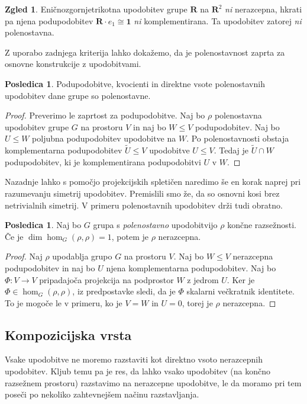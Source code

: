 \documentclass[11pt]{book}
\def\RR{\mathbf{R}}
\def\oneone{\mathbf{1}}
\theoremstyle{definition}
\theoremstyle{zgled}
\newtheorem{zgled}[theorem]{Zgled}
\theoremstyle{zgledbrezstevilke}
\theoremstyle{odprtproblem}
\theoremstyle{domacanaloga}
\newenvironment{dokaz}
    {\color{siva}\begin{proof}}
    {\end{proof}}
\theoremstyle{izrek}
\newtheorem{posledica}[theorem]{Posledica}
\begin{document}
\begin{zgled}
    Eničnozgornjetrikotna upodobitev grupe $\RR$ na $\RR^2$ \emph{ni} nerazcepna, hkrati pa njena podupodobitev $\RR \cdot e_1 \cong \oneone$ \emph{ni} komplementirana. Ta upodobitev zatorej \emph{ni} polenostavna.
\end{zgled}

Z uporabo zadnjega kriterija lahko dokažemo, da je polenostavnost zaprta za osnovne konstrukcije z upodobitvami.

\begin{posledica}
Podupodobitve, kvocienti in direktne vsote polenostavnih upodobitev dane grupe so polenostavne.
\end{posledica}
\begin{dokaz}
Preverimo le zaprtost za podupodobitve. Naj bo $\rho$ polenostavna upodobitev grupe $G$ na prostoru $V$ in naj bo $W \leq V$ podupodobitev. Naj bo $U \leq W$ poljubna podupodobitev upodobitve na $W$. Po polenostavnosti obstaja komplementarna podupodobitev $\tilde U \leq V$ upodobitve $U \leq V$. Tedaj je $\tilde U \cap W$ podupodobitev, ki je komplementirana podupodobitvi $U$ v $W$.
\end{dokaz}

Nazadnje lahko s pomočjo projekcijskih spletičen naredimo še en korak naprej pri razumevanju simetrij upodobitev. Premislili smo že, da so osnovni kosi brez netrivialnih simetrij. V primeru polenostavnih upodobitev drži tudi obratno.

\begin{posledica}
Naj bo $G$ grupa s \emph{polenostavno} upodobitvijo $\rho$ končne razsežnosti. Če je $\dim \hom_G(\rho, \rho) = 1$, potem je $\rho$ nerazcepna.
\end{posledica}
\begin{dokaz}
Naj $\rho$ upodablja grupo $G$ na prostoru $V$. Naj bo $W \leq V$ nerazcepna podupodobitev in naj bo $U$ njena komplementarna podupodobitev. Naj bo $\Phi \colon V \to V$ pripadajoča projekcija na podprostor $W$ z jedrom $U$. Ker je $\Phi \in \hom_G(\rho, \rho)$, iz predpostavke sledi, da je $\Phi$ skalarni večkratnik identitete. To je mogoče le v primeru, ko je $V = W$ in $U = 0$, torej je $\rho$ nerazcepna. 
\end{dokaz}


\subsection{Kompozicijska vrsta}

Vsake upodobitve ne moremo razstaviti kot direktno vsoto nerazcepnih upodobitev. Kljub temu pa je res, da lahko vsako upodobitev (na končno razsežnem prostoru) razstavimo na nerazcepne upodobitve, le da moramo pri tem poseči po nekoliko zahtevnejšem načinu razstavljanja.
\end{document}
